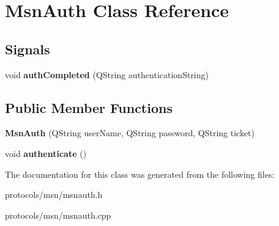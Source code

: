 \hypertarget{classMsnAuth}{
\section{MsnAuth Class Reference}
\label{classMsnAuth}
}
\subsection*{Signals}
\begin{DoxyCompactItemize}
\item 
\hypertarget{classMsnAuth_a272dd22c96b336a1f97362c4309b6a8b}{
void {\bfseries authCompleted} (QString authenticationString)}
\label{classMsnAuth_a272dd22c96b336a1f97362c4309b6a8b}

\end{DoxyCompactItemize}
\subsection*{Public Member Functions}
\begin{DoxyCompactItemize}
\item 
\hypertarget{classMsnAuth_ab7b086e29a4624cea5459d7a8b4e34fa}{
{\bfseries MsnAuth} (QString userName, QString password, QString ticket)}
\label{classMsnAuth_ab7b086e29a4624cea5459d7a8b4e34fa}

\item 
\hypertarget{classMsnAuth_ac28a69b24c4443018ddcd7c60a9efb73}{
void {\bfseries authenticate} ()}
\label{classMsnAuth_ac28a69b24c4443018ddcd7c60a9efb73}

\end{DoxyCompactItemize}


The documentation for this class was generated from the following files:\begin{DoxyCompactItemize}
\item 
protocols/msn/msnauth.h\item 
protocols/msn/msnauth.cpp\end{DoxyCompactItemize}
